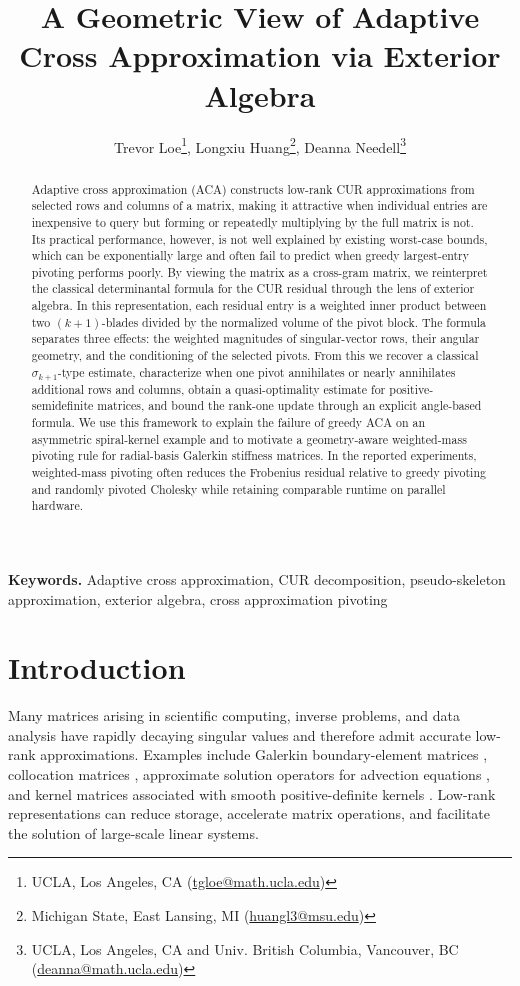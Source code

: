 \documentclass[11pt, preprint]{article}
\title{A Geometric View of Adaptive Cross Approximation via Exterior Algebra}%
\author{Trevor Loe\thanks{UCLA, Los Angeles, CA (\href{mailto:tgloe@math.ucla.edu}{tgloe@math.ucla.edu})}, Longxiu Huang\thanks{Michigan State, East Lansing, MI (\href{mailto:huangl3@msu.edu}{huangl3@msu.edu})}, Deanna Needell\thanks{UCLA, Los Angeles, CA and Univ. British Columbia, Vancouver, BC (\href{mailto:deanna@math.ucla.edu}{deanna@math.ucla.edu})}}
\date{}
\providecommand{\keywords}[1]
{
  \small	
  \textbf{Keywords. } #1
}
\begin{document}
\maketitle

\begin{abstract}
Adaptive cross approximation (ACA) constructs low-rank CUR approximations from selected rows and columns of a matrix, making it attractive when individual entries are inexpensive to query but forming or repeatedly multiplying by the full matrix is not. Its practical performance, however, is not well explained by existing worst-case bounds, which can be exponentially large and often fail to predict when greedy largest-entry pivoting performs poorly. By viewing the matrix as a cross-gram matrix, we reinterpret the classical determinantal formula for the CUR residual through the lens of exterior algebra. In this representation, each residual entry is a weighted inner product between two $(k+1)$-blades divided by the normalized volume of the pivot block. The formula separates three effects: the weighted magnitudes of singular-vector rows, their angular geometry, and the conditioning of the selected pivots. From this we recover a classical $\sigma_{k+1}$-type estimate, characterize when one pivot annihilates or nearly annihilates additional rows and columns, obtain a quasi-optimality estimate for positive-semidefinite matrices, and bound the rank-one update through an explicit angle-based formula. We use this framework to explain the failure of greedy ACA on an asymmetric spiral-kernel example and to motivate a geometry-aware weighted-mass pivoting rule for radial-basis Galerkin stiffness matrices. In the reported experiments, weighted-mass pivoting often reduces the Frobenius residual relative to greedy pivoting and randomly pivoted Cholesky while retaining comparable runtime on parallel hardware.
\end{abstract}

\keywords{Adaptive cross approximation, CUR decomposition, pseudo-skeleton approximation, exterior algebra, cross approximation pivoting}

\section{Introduction}

Many matrices arising in scientific computing, inverse problems, and data
analysis have rapidly decaying singular values and therefore admit accurate
low-rank approximations. Examples include Galerkin boundary-element matrices
\cite{Bebendorf_AcceleratingGalerkinBEM2006,
Bebendorf_ApproximationBoundaryElement2000}, collocation matrices
\cite{Bebendorf_AdaptiveLowRankApproximation2003}, approximate solution
operators for advection equations
\cite{Zheng_SemiLagrangianAdaptiveRankSLAR2024}, and kernel matrices associated
with smooth positive-definite kernels
\cite{Chen_RandomlyPivotedCholesky2025}. Low-rank representations can reduce
storage, accelerate matrix operations, and facilitate the solution of
large-scale linear systems.
\end{document}
